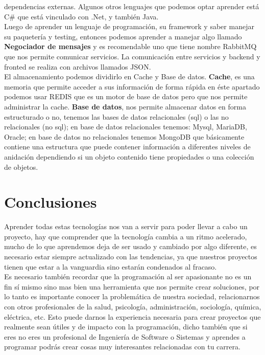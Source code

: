 \documentclass[twocolumns,a4paper]{IEEEtran}
\begin{document}
dependencias externas.  Algunos otros lenguajes que podemos optar aprender está
C\# que está vinculado con .Net, y también Java.\\
Luego de aprender un lenguaje de programación, su framework y saber manejar su
paquetería y testing, entonces podemos aprender a manejar algo llamado
\textbf{Negociador de mensajes} y es recomendable uno que tiene nombre RabbitMQ
que nos permite comunicar servicios. La comunicación entre servicios y backend
y fronted se realiza con archivos llamados JSON.\\
El almacenamiento podemos dividirlo en Cache y Base de datos. \textbf{Cache},
es una memoria que permite acceder a sus información de forma rápida en éste
apartado podemos usar REDIS que es un motor de base de datos pero que nos
permite administrar la cache. \textbf{Base de datos}, nos permite almacenar
datos en forma estructurado o no, tenemos las bases de datos relacionales (sql)
o las no relacionales (no sql); en base de datos relacionales tenemos: Mysql,
MariaDB, Oracle; en base de datos no relacionales tenemos MongoDB que
básicamente contiene una estructura que puede contener información a diferentes
niveles de anidación dependiendo si un objeto contenido tiene propiedades o una
colección de objetos.

\section{Conclusiones}
Aprender todas estas tecnologías nos van a servir para poder llevar a cabo un
proyecto, hay que comprender que la tecnología cambia a un ritmo acelerado,
mucho de lo que aprendemos deja de ser usado y cambiado por algo diferente, es
necesario estar siempre actualizado con las tendencias, ya que nuestros
proyectos tienen que estar a la vanguardia sino estarán condenados al fracaso.\\
Es necesario también recordar que la programación al ser apasionante no es un
fin sí mismo sino mas bien una herramienta que nos permite crear soluciones,
por lo tanto es importante conocer la problemática de nuestra sociedad,
relacionarnos con otros profesionales de la salud, psicología, administración,
sociología, química, eléctrica, etc. Esto puede darnos la experiencia necesaria para
crear proyectos que realmente sean útiles y de impacto con la programación,
dicho también que si eres no eres un profesional de Ingeniería de Software o
Sistemas y aprendes a programar podrás crear cosas muy interesantes
relacionadas con tu carrera.


\printbibliography
\end{document}
